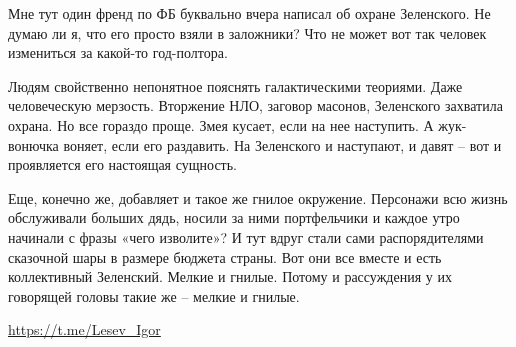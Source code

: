 Мне тут один френд по ФБ буквально вчера написал об охране Зеленского. Не думаю
ли я, что его просто взяли в заложники? Что не может вот так человек измениться
за какой-то год-полтора.

Людям свойственно непонятное пояснять галактическими теориями. Даже
человеческую мерзость. Вторжение НЛО, заговор масонов, Зеленского захватила
охрана. Но все гораздо проще. Змея кусает, если на нее наступить. А жук-вонючка
воняет, если его раздавить. На Зеленского и наступают, и давят – вот и
проявляется его настоящая сущность.

Еще, конечно же, добавляет и такое же гнилое окружение. Персонажи всю жизнь
обслуживали больших дядь, носили за ними портфельчики и каждое утро начинали с
фразы «чего изволите»? И тут вдруг стали сами распорядителями сказочной шары в
размере бюджета страны. Вот они все вместе и есть коллективный Зеленский.
Мелкие и гнилые. Потому и рассуждения у их говорящей головы такие же – мелкие и
гнилые.

\url{https://t.me/Lesev_Igor}
